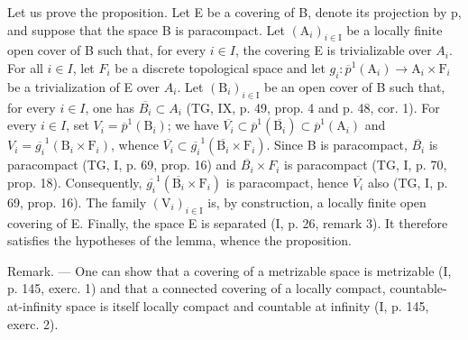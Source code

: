 Let us prove the proposition. Let E be a covering of B, denote its projection by p, and suppose that the space B is paracompact. Let \((\mathrm{A}_{i})_{i\in\mathrm{I}}\) be a locally finite open cover of B such that, for every \(i\in I\), the covering E is trivializable over \(A_{i}\). For all \(i\in I\), let \(F_{i}\) be a discrete topological space and let \(g_{i}\colon\overline{p}^{1}(\mathrm{A}_{i})\to\mathrm{A}_{i}\times\mathrm{F}_{i}\) be a trivialization of E over \(A_{i}\). Let \((\mathrm{B}_{i})_{i\in\mathrm{I}}\) be an open cover of B such that, for every \(i\in I\), one has \(\overline{B_{i}}\subset A_{i}\) (TG, IX, p. 49, prop. 4 and p. 48, cor. 1). For every \(i\in I\), set \(V_{i}=\overline{p}^{1}(\mathrm{B}_{i})\); we have \(\overline{V_{i}}\subset\overline{p}^{1}(\overline{\mathrm{B}_{i}})\subset\overline{p}^{1}(\mathrm{A}_{i})\) and \(V_{i}=\overline{g_{i}}^{1}(\mathrm{B}_{i}\times\mathrm{F}_{i})\), whence \(\overline{V_{i}}\subset\overline{g_{i}}^{1}(\overline{\mathrm{B}_{i}}\times\mathrm{F}_{i})\). Since B is paracompact, \(\overline{B_{i}}\) is paracompact (TG, I, p. 69, prop. 16) and \(\overline{B_{i}}\times F_{i}\) is paracompact (TG, I, p. 70, prop. 18). Consequently, \(\overline{g_{i}}^{1}(\overline{\mathrm{B}_{i}}\times\mathrm{F}_{i})\) is paracompact, hence \(\overline{V_{i}}\) also (TG, I, p. 69, prop. 16). The family \((\mathrm{V}_{i})_{i\in\mathrm{I}}\) is, by construction, a locally finite open covering of E. Finally, the space E is separated (I, p. 26, remark 3). It therefore satisfies the hypotheses of the lemma, whence the proposition.

Remark. --- One can show that a covering of a metrizable space is metrizable (I, p. 145, exerc. 1) and that a connected covering of a locally compact, countable-at-infinity space is itself locally compact and countable at infinity (I, p. 145, exerc. 2).

